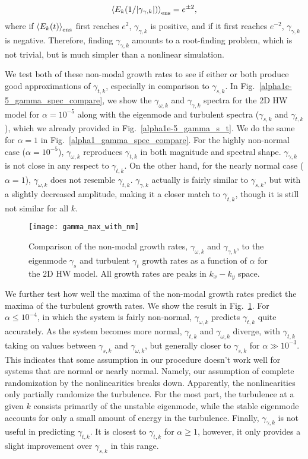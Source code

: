 \documentclass[letter,scriptaddress,twocolumn, prl,showkeys]{revtex4}
\def\beq{\begin{equation}}
\def\eeq{\end{equation}}
\begin{document}
\beq
\label{gamma_pm2}
\left< E_k(1/|\gamma_{\gamma,k}|) \right>_{\rm{ens}} = e^{\pm 2},
\eeq
where if $\left< E_k(t) \right>_{\rm{ens}}$ first reaches $e^2$, $\gamma_{\gamma,k}$ is positive, and if it first reaches $e^{-2}$, $\gamma_{\gamma,k}$ is negative.
Therefore, finding $\gamma_{\gamma,k}$ amounts to a root-finding problem, which is not trivial, but is much simpler than a nonlinear simulation. 

We test both of these non-modal growth rates to see if either or both produce good approximations of $\gamma_{t,k}$, especially in comparison to $\gamma_{s,k}$. 
In Fig.~\ref{alpha1e-5_gamma_spec_compare}, we show the $\gamma_{\omega,k}$ and $\gamma_{\gamma,k}$ spectra for the 2D HW
model for $\alpha=10^{-5}$ along with the eigenmode and turbulent spectra ($\gamma_{s,k}$ and $\gamma_{t,k}$), which we already provided in Fig.~\ref{alpha1e-5_gamma_s_t}. We do the same for
$\alpha=1$ in Fig.~\ref{alpha1_gamma_spec_compare}. For the highly non-normal case ($\alpha = 10^{-5}$), $\gamma_{\omega,k}$ reproduces $\gamma_{t,k}$ in both magnitude and spectral shape. 
$\gamma_{\gamma,k}$ is not close in any respect to $\gamma_{t,k}$. On the other hand, for the nearly normal case ($\alpha=1$), $\gamma_{\omega,k}$ does not resemble $\gamma_{t,k}$. 
$\gamma_{\gamma,k}$ actually is fairly similar to $\gamma_{s,k}$, but with a slightly decreased amplitude, making it a closer match to $\gamma_{t,k}$, though it is still not similar for all $k$.

\begin{figure}
\centerline{\texttt{[image: gamma\_max\_with\_nm]}}
\caption{Comparison of the non-modal growth rates, $\gamma_{\omega,k}$ and $\gamma_{\gamma,k}$, to the eigenmode $\gamma_{s}$ and turbulent $\gamma_{t}$ growth rates as a function of $\alpha$
for the 2D HW model. All growth rates are peaks in $k_x-k_y$ space.}
\label{gamma_max_with_nm}
\end{figure}

We further test how well the maxima of the non-modal growth rates predict the maxima of the turbulent growth rates. We show the result in Fig.~\ref{gamma_max_with_nm}. For $\alpha \le 10^{-4}$,
in which the system is fairly non-normal, $\gamma_{\omega,k}$ predicts $\gamma_{t,k}$ quite accurately. As the system becomes more normal, $\gamma_{t,k}$ and $\gamma_{\omega,k}$ diverge, with
$\gamma_{t,k}$ taking on values between $\gamma_{s,k}$ and $\gamma_{\omega,k}$, but generally closer to $\gamma_{s,k}$ for $\alpha \gg 10^{-3}$. 
This indicates that some assumption in our procedure doesn't work well for systems that are normal or nearly normal. Namely, our assumption
of complete randomization by the nonlinearities breaks down. Apparently, the nonlinearities only partially randomize the turbulence. For the most part, the turbulence at a given $k$ consists
primarily of the unstable eigenmode, while the stable eigenmode accounts for only a small amount of energy in the turbulence. Finally, $\gamma_{\gamma,k}$ is not useful in predicting $\gamma_{t,k}$.
It is closest to $\gamma_{t,k}$ for $\alpha \ge 1$, however, it only provides a slight improvement over $\gamma_{s,k}$ in this range.
\end{document}
